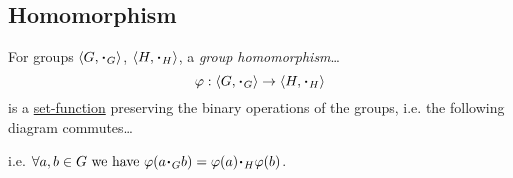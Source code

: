 \subsection{Homomorphism}\label{grouphomomorphism}

For groups $\langle G, \LargerCdot_G \rangle$, $\langle H, \LargerCdot_H \rangle$, a \emph{group homomorphism}\dots
$$\varphi : \langle G, \LargerCdot_G \rangle \rightarrow \langle H, \LargerCdot_H \rangle$$
is a \hyperref[function]{set-function} preserving the binary operations of the groups, i.e. the following diagram commutes\dots

\begin{figure}[H]
\centering

\end{figure}

\noindent i.e. $\forall a,b \in G \textrm{ we have } \varphi(a \LargerCdot_G b) = \varphi(a) \LargerCdot_H \varphi(b)$.